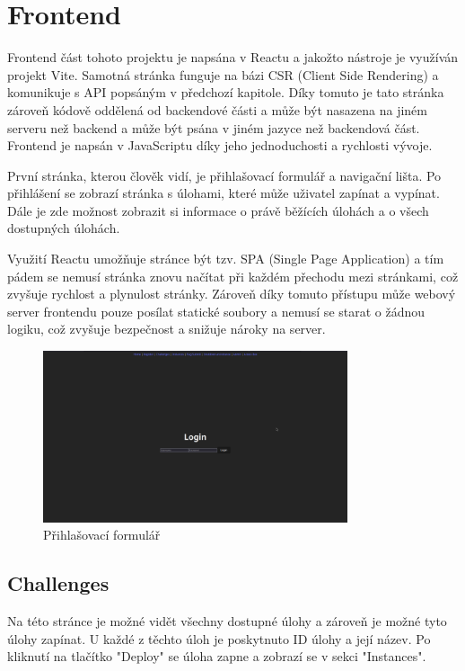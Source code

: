 \documentclass[12pt, a4paper,
oneside,      %
openright
]{report}
\begin{document}
\chapter{Frontend}
Frontend část tohoto projektu je napsána v Reactu a jakožto nástroje je využíván projekt Vite. Samotná stránka funguje na bázi CSR (Client Side Rendering) a komunikuje s API popsáným v předchozí kapitole. Díky tomuto je tato stránka zároveň kódově oddělená od backendové části a může být nasazena na jiném serveru než backend a může být psána v jiném jazyce než backendová část. Frontend je napsán v JavaScriptu díky jeho jednoduchosti a rychlosti vývoje.

První stránka, kterou člověk vidí, je přihlašovací formulář a navigační lišta. Po přihlášení se zobrazí stránka s úlohami, které může uživatel zapínat a vypínat. Dále je zde možnost zobrazit si informace o právě běžících úlohách a o všech dostupných úlohách.

Využití Reactu umožňuje stránce být tzv. SPA (Single Page Application) a tím pádem se nemusí stránka znovu načítat při každém přechodu mezi stránkami, což zvyšuje rychlost a plynulost stránky. Zároveň díky tomuto přístupu může webový server frontendu pouze posílat statické soubory a nemusí se starat o žádnou logiku, což zvyšuje bezpečnost a snižuje nároky na server.

\begin{figure}[h]
	\centering
	\includegraphics[width=0.8\textwidth]{01-login_screen.png}
	\caption{Přihlašovací formulář}
	\label{fig:frontend-login}
\end{figure}

\section{Challenges}
Na této stránce je možné vidět všechny dostupné úlohy a zároveň je možné tyto úlohy zapínat. U každé z těchto úloh je poskytnuto ID úlohy a její název. Po kliknutí na tlačítko "Deploy" se úloha zapne a zobrazí se v sekci "Instances".
\end{document}
